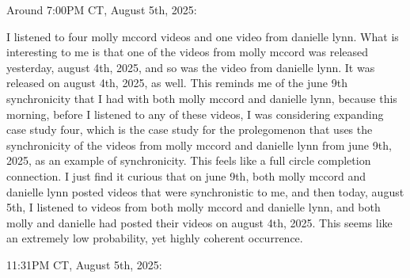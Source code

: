 \documentclass{article}
\begin{document}
Around 7:00PM CT, August 5th, 2025:

I listened to four molly mccord videos and one video from danielle lynn. What is interesting to me is that one of the videos from molly mccord was released yesterday, august 4th, 2025, and so was the video from danielle lynn. It was released on august 4th, 2025, as well. This reminds me of the june 9th synchronicity that I had with both molly mccord and danielle lynn, because this morning, before I listened to any of these videos, I was considering expanding case study four, which is the case study for the prolegomenon that uses the synchronicity of the videos from molly mccord and danielle lynn from june 9th, 2025, as an example of synchronicity. This feels like a full circle completion connection. I just find it curious that on june 9th, both molly mccord and danielle lynn posted videos that were synchronistic to me, and then today, august 5th, I listened to videos from both molly mccord and danielle lynn, and both molly and danielle had posted their videos on august 4th, 2025. This seems like an extremely low probability, yet highly coherent occurrence.

11:31PM CT, August 5th, 2025:
\end{document}
